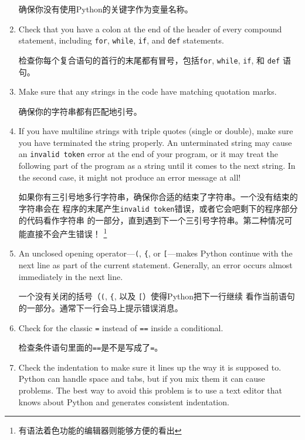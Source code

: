\documentclass[10pt]{book}
\begin{document}
\begin{CJK}{UTF8}{gbsn}
\begin{enumerate}
确保你没有使用Python的关键字作为变量名称。

\item Check that you have a colon at the end of the header of every
compound statement, including {\tt for}, {\tt while},
{\tt if}, and {\tt def} statements.

检查你每个复合语句的首行的末尾都有冒号，包括{\tt for}, {\tt while},
{\tt if}, 和 {\tt def} 语句。

\item Make sure that any strings in the code have matching
quotation marks.

确保你的字符串都有匹配地引号。

\item If you have multiline strings with triple quotes (single or double), make
sure you have terminated the string properly.  An unterminated string
may cause an {\tt invalid token} error at the end of your program,
or it may treat the following part of the program as a string until it
comes to the next string.  In the second case, it might not produce an error
message at all!

如果你有三引号地多行字符串，确保你合适的结束了字符串。一个没有结束的字符串会在
程序的末尾产生{\tt invalid token}错误，或者它会吧剩下的程序部分的代码看作字符串
的一部分，直到遇到下一个三引号字符串。第二种情况可能直接不会产生错误！
\footnote{有语法着色功能的编辑器则能够方便的看出}

\item An unclosed opening operator---\verb+(+, \verb+{+, or
  \verb+[+---makes Python continue with the next line as part of the
  current statement.  Generally, an error occurs almost immediately in
  the next line.

  一个没有关闭的括号（\verb+(+, \verb+{+, 以及 \verb+[+）使得Python把下一行继续
          看作当前语句的一部分。通常下一行会马上提示错误消息。

\item Check for the classic {\tt =} instead of {\tt ==} inside
a conditional.

检查条件语句里面的{\tt ==}是不是写成了{\tt =}。

\item Check the indentation to make sure it lines up the way it
is supposed to.  Python can handle space and tabs, but if you mix
them it can cause problems.  The best way to avoid this problem
is to use a text editor that knows about Python and generates
consistent indentation.


\end{enumerate}
\end{CJK}
\end{document}
